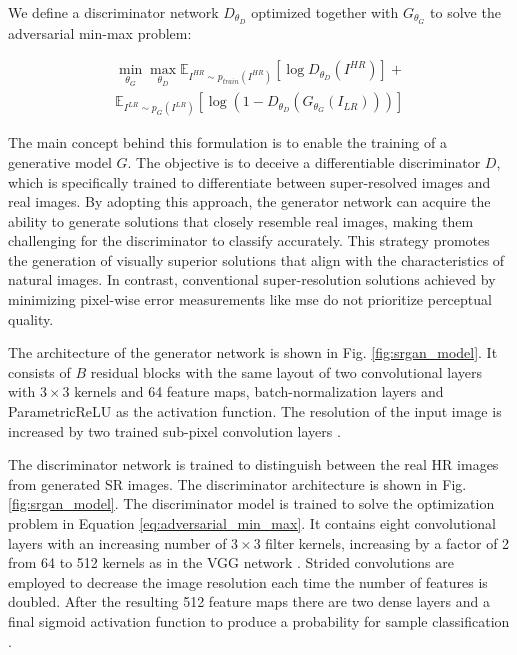 \documentclass[conference]{IEEEtran}
\begin{document}
We define a discriminator network $D_{\theta_D}$ optimized together with $G_{\theta_G}$ to solve the adversarial min-max problem:

\begin{gather*} \label{eq:adversarial_min_max}
	\min_{\theta_G} \max_{\theta_D} \mathbb{E}_{I^{HR} \sim p_{train} (I^{HR}) }  [ \log D_{\theta_D}(I^{HR})  ] + \\
	\mathbb{E}_{I^{LR} \sim p_G (I^{LR})} [ \log (1 - D_{\theta_D} ( G_{\theta_G} (I_{LR}) )) ]
\end{gather*}

The main concept behind this formulation is to enable the training of a generative model $G$. The objective is to deceive a differentiable discriminator $D$, which is specifically trained to differentiate between super-resolved images and real images. By adopting this approach, the generator network can acquire the ability to generate solutions that closely resemble real images, making them challenging for the discriminator to classify accurately. This strategy promotes the generation of visually superior solutions that align with the characteristics of natural images. In contrast, conventional super-resolution solutions achieved by minimizing pixel-wise error measurements like \acrshort{mse} do not prioritize perceptual quality.

The architecture of the generator network is shown in Fig. \ref{fig:srgan_model}. It consists of $B$ residual blocks with the same layout of two convolutional layers with $3 \times 3$ kernels and 64 feature maps, batch-normalization layers and ParametricReLU \cite{delve_deep_into_rectifiers_2015} as the activation function. The resolution of the input image is increased by two trained sub-pixel convolution layers \cite{sub_pixel_cnn_2016}.

The discriminator network is trained to distinguish between the real HR images from generated SR images. The discriminator architecture is shown in Fig. \ref{fig:srgan_model}. The discriminator model is trained to solve the optimization problem in Equation \ref{eq:adversarial_min_max}. It contains eight convolutional layers with an increasing number of $3 \times 3$ filter kernels, increasing by a factor of 2 from 64 to 512 kernels as in the VGG network \cite{vgg_very_deep_cnn_2014}. Strided convolutions are employed to decrease the image resolution each time the number of features is doubled. After the resulting 512 feature maps there are two dense layers and a final sigmoid activation function to produce a probability for sample classification \cite{srgan_2016}.
\end{document}

